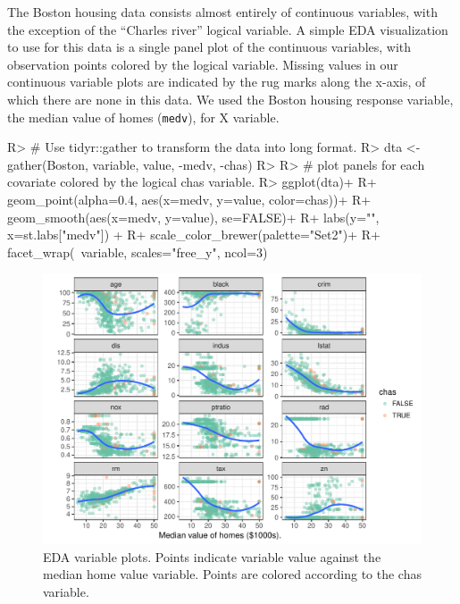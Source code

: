 \documentclass[article]{jss}
\begin{document}
The Boston housing data consists almost entirely of continuous
variables, with the exception of the ``Charles river'' logical variable.
A simple EDA visualization to use for this data is a single panel plot
of the continuous variables, with observation points colored by the
logical variable. Missing values in our continuous variable plots are
indicated by the rug marks along the x-axis, of which there are none in
this data. We used the Boston housing response variable, the median
value of homes (\texttt{medv}), for X variable.

\begin{CodeChunk}

\begin{CodeInput}
R> # Use tidyr::gather to transform the data into long format.
R> dta <- gather(Boston, variable, value, -medv, -chas)
R> 
R> # plot panels for each covariate colored by the logical chas variable.
R> ggplot(dta)+
R+   geom_point(alpha=0.4, aes(x=medv, y=value, color=chas))+
R+   geom_smooth(aes(x=medv, y=value), se=FALSE)+ 
R+   labs(y="", x=st.labs["medv"]) +
R+   scale_color_brewer(palette="Set2")+
R+   facet_wrap(~variable, scales="free_y", ncol=3)
\end{CodeInput}
\begin{figure}

{\centering \includegraphics{Regression-rfsrc_files/figure-latex/eda-1} 

}

\caption[EDA variable plots]{EDA variable plots. Points indicate variable value against the median home value variable. Points are colored according to the chas variable.}\label{fig:eda}
\end{figure}
\end{CodeChunk}
\end{document}
